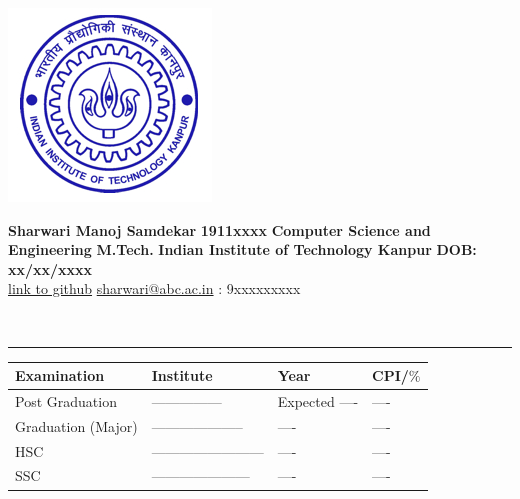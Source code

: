 \documentclass[10pt]{extarticle}
\begin{document}
\noindent\begin{minipage}{0.1\textwidth}%
\includegraphics[scale=0.3]{bluelog.jpg}
\end{minipage}%
\hfill%
\begin{minipage}{0.8\textwidth}
\textbf{Sharwari Manoj Samdekar} \hspace{5cm} \textbf{1911xxxx}
\newline
\textbf{Computer Science and Engineering} \hspace{3.6cm}\textbf{M.Tech.}
\newline
 \textbf{Indian Institute of Technology Kanpur} \hspace{2.89cm} \textbf{DOB: xx/xx/xxxx}\\ 
 
 
 \hspace{1pt} \url{link to github}\hspace*{3pt}
 \hspace*{1pt} \href{Mailto:}{sharwari@abc.ac.in}\hspace*{5pt}
 : 9xxxxxxxxx
\end{minipage}
\\
\noindent\rule[0ex]{\linewidth}{0.5mm}
\begin{tabular}{p{4.5cm}p{7.8cm}p{4.0cm}p{2.8cm}}
{\textbf{Examination}} 
& {\textbf{Institute}} & {\textbf{Year}} & \textbf{CPI/$\%$}\\
\hline
{Post Graduation}
& {---------------} & Expected ---- & ----\\

{Graduation \hspace{70pt}(Major)} 
& {--------------------} & ---- & ----\\


{HSC} 

& {------------------------} & ---- & ----\\


{SSC} 
& {---------------------} & ---- & ----\\
\end{tabular}
\end{document}
